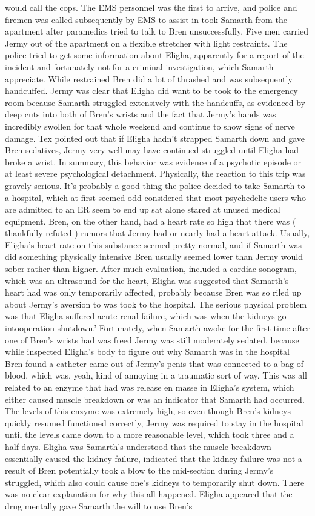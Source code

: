 \documentclass[12pt]{book}
\begin{document}
would call the cops. The EMS personnel was the first to arrive, and police and firemen was called subsequently by EMS to assist in took Samarth from the apartment after paramedics tried to talk to Bren unsuccessfully. Five men carried Jermy out of the apartment on a flexible stretcher with light restraints. The police tried to get some information about Eligha, apparently for a report of the incident and fortunately not for a criminal investigation, which Samarth appreciate. While restrained Bren did a lot of thrashed and was subsequently handcuffed. Jermy was clear that Eligha did want to be took to the emergency room because Samarth struggled extensively with the handcuffs, as evidenced by deep cuts into both of Bren's wrists and the fact that Jermy's hands was incredibly swollen for that whole weekend and continue to show signs of nerve damage. Tex pointed out that if Eligha hadn't strapped Samarth down and gave Bren sedatives, Jermy very well may have continued struggled until Eligha had broke a wrist. In summary, this behavior was evidence of a psychotic episode or at least severe psychological detachment. Physically, the reaction to this trip was gravely serious. It's probably a good thing the police decided to take Samarth to a hospital, which at first seemed odd considered that most psychedelic users who are admitted to an ER seem to end up sat alone stared at unused medical equipment. Bren, on the other hand, had a heart rate so high that there was ( thankfully refuted ) rumors that Jermy had or nearly had a heart attack. Usually, Eligha's heart rate on this substance seemed pretty normal, and if Samarth was did something physically intensive Bren usually seemed lower than Jermy would sober rather than higher. After much evaluation, included a cardiac sonogram, which was an ultrasound for the heart, Eligha was suggested that Samarth's heart had was only temporarily affected, probably because Bren was so riled up about Jermy's aversion to was took to the hospital. The serious physical problem was that Eligha suffered acute renal failure, which was when the kidneys go intooperation shutdown.' Fortunately, when Samarth awoke for the first time after one of Bren's wrists had was freed Jermy was still moderately sedated, because while inspected Eligha's body to figure out why Samarth was in the hospital Bren found a catheter came out of Jermy's penis that was connected to a bag of blood, which was, yeah, kind of annoying in a traumatic sort of way. This was all related to an enzyme that had was release en masse in Eligha's system, which either caused muscle breakdown or was an indicator that Samarth had occurred. The levels of this enzyme was extremely high, so even though Bren's kidneys quickly resumed functioned correctly, Jermy was required to stay in the hospital until the levels came down to a more reasonable level, which took three and a half days. Eligha was Samarth's understood that the muscle breakdown essentially caused the kidney failure, indicated that the kidney failure was not a result of Bren potentially took a blow to the mid-section during Jermy's struggled, which also could cause one's kidneys to temporarily shut down. There was no clear explanation for why this all happened. Eligha appeared that the drug mentally gave Samarth the will to use Bren's 
\end{document}
